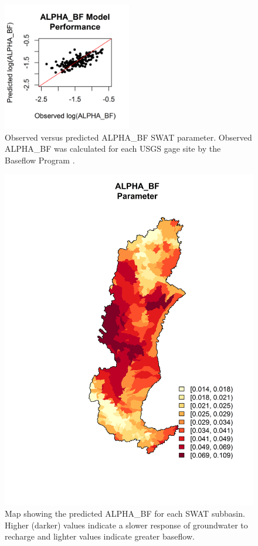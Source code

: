 \begin{figure}
	\centering
	\includegraphics[width=0.5\textwidth]{./img/alpha_bf_scatterplot.png}
	\caption{Observed versus predicted ALPHA\_BF SWAT parameter. Observed ALPHA\_BF was calculated for each USGS gage site  by the Baseflow Program \citep{arnold_automated_1995}.}
	\label{fig:alpha_bf_scatterplot}
\end{figure}

\begin{figure}[h!]
	\centering
	\includegraphics[width=\textwidth]{./img/alpha_bf.png}
	\caption{Map showing the predicted ALPHA\_BF for each SWAT subbasin. Higher (darker) values indicate a slower response of groundwater to recharge and lighter
	values indicate greater baseflow.}
	\label{fig:alpha_bf}
\end{figure}

